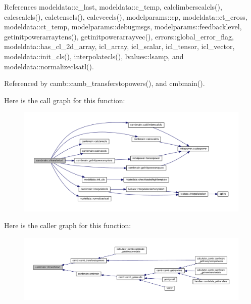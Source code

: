 References modeldata\+::c\+\_\+last, modeldata\+::c\+\_\+temp, calclimberscalcls(), calcscalcls(), calctenscls(), calcveccls(), modelparams\+::cp, modeldata\+::ct\+\_\+cross, modeldata\+::ct\+\_\+temp, modelparams\+::debugmsgs, modelparams\+::feedbacklevel, getinitpowerarraytens(), getinitpowerarrayvec(), errors\+::global\+\_\+error\+\_\+flag, modeldata\+::has\+\_\+cl\+\_\+2d\+\_\+array, icl\+\_\+array, icl\+\_\+scalar, icl\+\_\+tensor, icl\+\_\+vector, modeldata\+::init\+\_\+cls(), interpolatecls(), lvalues\+::lsamp, and modeldata\+::normalizeclsatl().



Referenced by camb\+::camb\+\_\+transferstopowers(), and cmbmain().

Here is the call graph for this function\+:
\nopagebreak
\begin{figure}[H]
\begin{center}
\leavevmode
\includegraphics[width=350pt]{namespacecambmain_a15c0f01f07762c709f8f718935153d7a_cgraph}
\end{center}
\end{figure}
Here is the caller graph for this function\+:
\nopagebreak
\begin{figure}[H]
\begin{center}
\leavevmode
\includegraphics[width=350pt]{namespacecambmain_a15c0f01f07762c709f8f718935153d7a_icgraph}
\end{center}
\end{figure}
\mbox{\label{namespacecambmain_a8863977991a108f96a26fc99e8c5e129}} 
